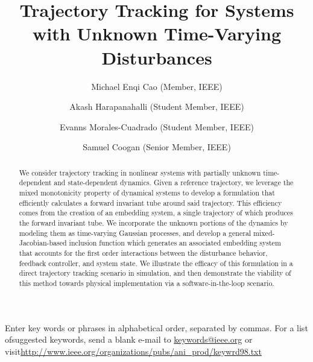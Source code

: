 \documentclass{IEEEojcsys}
\begin{document}

\title{Trajectory Tracking for Systems with Unknown Time-Varying Disturbances} 


\author{Michael Enqi Cao (Member, IEEE)}

\author{Akash Harapanahalli  (Student Member, IEEE)}

\author{Evanns Morales-Cuadrado (Student Member, IEEE)}

\author{Samuel Coogan (Senior Member, IEEE)}







\begin{abstract}
We consider trajectory tracking in nonlinear systems with partially unknown time-dependent and state-dependent dynamics. Given a reference trajectory, we leverage the mixed monotonicity property of dynamical systems to develop a formulation that efficiently calculates a forward invariant tube around said trajectory. This efficiency comes from the creation of an embedding system, a single trajectory of which produces the forward invariant tube. We incorporate the unknown portions of the dynamics by modeling them as time-varying Gaussian processes, and develop a general mixed-Jacobian-based inclusion function which generates an associated embedding system that accounts for the first order interactions between the disturbance behavior, feedback controller, and system state. We illustrate the efficacy of this formulation in a direct trajectory tracking scenario in simulation, and then demonstrate the viability of this method towards physical implementation via a software-in-the-loop scenario.
\end{abstract}

\begin{IEEEkeywords}
Enter key words or phrases in alphabetical order, separated by commas. For a list of\goodbreak suggested keywords, send a blank e-mail to \href{mailto:keywords@ieee.org}{keywords@ieee.org} or visit\goodbreak \href{http://www.ieee.org/organizations/pubs/ani_prod/keywrd98.txt}{http://www.ieee.org/organizations/pubs/ani\_prod/keywrd98.txt}
\end{IEEEkeywords}
\end{document}
